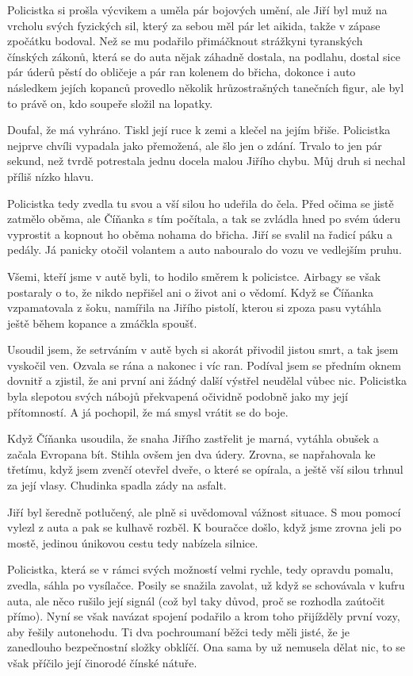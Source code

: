 Policistka si prošla výcvikem a uměla pár bojových umění, ale Jiří byl muž na vrcholu svých fyzických sil, který za sebou měl pár let aikida, takže v zápase zpočátku bodoval. Než se mu podařilo přimáčknout strážkyni tyranských čínských zákonů, která se do auta nějak záhadně dostala, na podlahu, dostal sice pár úderů pěstí do obličeje a pár ran kolenem do břicha, dokonce i auto následkem jejích kopanců provedlo několik hrůzostrašných tanečních figur, ale byl to právě on, kdo soupeře složil na lopatky. 

Doufal, že má vyhráno. Tiskl její ruce k zemi a klečel na jejím břiše. Policistka nejprve chvíli vypadala jako přemožená, ale šlo jen o zdání. Trvalo to jen pár sekund, než tvrdě potrestala jednu docela malou Jiřího chybu. Můj druh si nechal příliš nízko hlavu.

 Policistka tedy zvedla tu svou a vší silou ho udeřila do čela. Před očima se jistě zatmělo oběma, ale Číňanka s tím počítala, a tak se zvládla hned po svém úderu vyprostit a kopnout ho oběma nohama do břicha. Jiří se svalil na řadicí páku a pedály. Já panicky otočil volantem a auto nabouralo do vozu ve vedlejším pruhu.
 
Všemi, kteří jsme v autě byli, to hodilo směrem k policistce. Airbagy se však postaraly o to, že nikdo nepřišel ani o život ani o vědomí. Když se Číňanka vzpamatovala z šoku, namířila na Jiřího pistolí, kterou si zpoza pasu vytáhla ještě během kopance a zmáčkla spoušť.

Usoudil jsem, že setrváním v autě bych si akorát přivodil jistou smrt, a tak jsem vyskočil ven. Ozvala se rána a nakonec i víc ran.  Podíval jsem se předním oknem dovnitř a zjistil, že ani první ani žádný další výstřel neudělal vůbec nic. Policistka byla slepotou svých nábojů překvapená očividně podobně jako my její přítomností. A já pochopil, že má smysl vrátit se do boje.

Když Číňanka usoudila, že snaha Jiřího zastřelit je marná, vytáhla obušek a začala Evropana bít. Stihla ovšem jen dva údery. Zrovna, se napřahovala ke třetímu, když jsem zvenčí otevřel dveře, o které se opírala, a ještě vší silou trhnul za její vlasy. Chudinka spadla zády na asfalt.

Jiří byl šeredně potlučený, ale plně si uvědomoval vážnost situace. S mou pomocí vylezl z auta a pak se kulhavě rozběl. K bouračce došlo, když jsme zrovna jeli po mostě, jedinou únikovou cestu tedy nabízela silnice.

Policistka, která se v rámci svých možností velmi rychle, tedy opravdu pomalu, zvedla, sáhla po vysílačce. Posily se snažila zavolat, už když se schovávala v kufru auta, ale něco rušilo její signál (což byl taky důvod, proč se rozhodla zaútočit přímo). Nyní se však navázat spojení podařilo a krom toho přijížděly první vozy, aby řešily autonehodu. Ti dva pochroumaní běžci tedy měli jisté, že je zanedlouho bezpečnostní složky obklíčí. Ona sama by už nemusela dělat nic, to se však příčilo její činorodé čínské nátuře.

